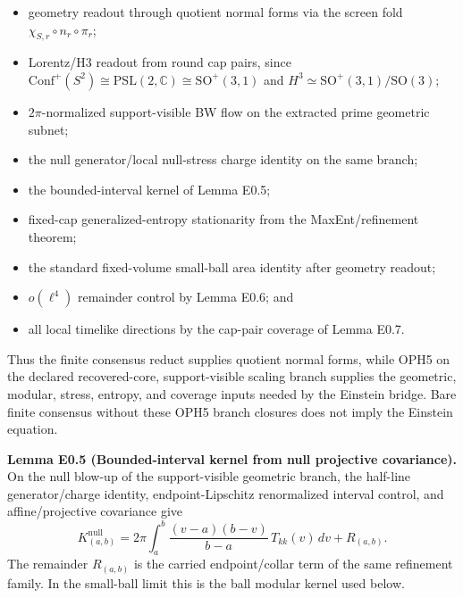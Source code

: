 \begin{itemize}
\tightlist
\item
  geometry readout through quotient normal forms via the screen fold \(\chi_{S,r}\circ n_r\circ\pi_r\);
\item
  Lorentz/H3 readout from round cap pairs, since \(\mathrm{Conf}^+(S^2)\cong \mathrm{PSL}(2,\mathbb C)\cong \mathrm{SO}^+(3,1)\) and \(H^3\simeq\mathrm{SO}^+(3,1)/\mathrm{SO}(3)\);
\item
  \(2\pi\)-normalized support-visible BW flow on the extracted prime geometric subnet;
\item
  the null generator/local null-stress charge identity on the same branch;
\item
  the bounded-interval kernel of Lemma E0.5;
\item
  fixed-cap generalized-entropy stationarity from the MaxEnt/refinement theorem;
\item
  the standard fixed-volume small-ball area identity after geometry readout;
\item
  \(o(\ell^4)\) remainder control by Lemma E0.6; and
\item
  all local timelike directions by the cap-pair coverage of Lemma E0.7.
\end{itemize}

Thus the finite consensus reduct supplies quotient normal forms, while OPH5 on the declared recovered-core, support-visible scaling branch supplies the geometric, modular, stress, entropy, and coverage inputs needed by the Einstein bridge. Bare finite consensus without these OPH5 branch closures does not imply the Einstein equation.

\textbf{Lemma E0.5 (Bounded-interval kernel from null projective covariance).} On the null blow-up of the support-visible geometric branch, the half-line generator/charge identity, endpoint-Lipschitz renormalized interval control, and affine/projective covariance give
\[
K_{(a,b)}^{\mathrm{null}}
=2\pi\int_a^b \frac{(v-a)(b-v)}{b-a}\,T_{kk}(v)\,dv
+R_{(a,b)} .
\]
The remainder \(R_{(a,b)}\) is the carried endpoint/collar term of the same refinement family. In the small-ball limit this is the ball modular kernel used below.

